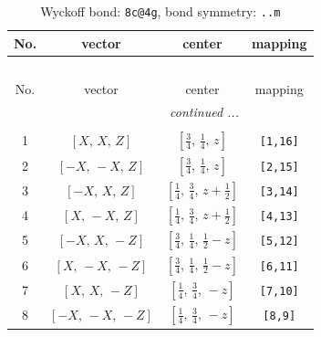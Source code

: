 \documentclass[fleqn,8pt]{jsarticle}
\begin{document}
\renewcommand{\arraystretch}{1.2}
\begin{longtable}{cccc}
\caption{Wyckoff bond: {\tt 8c@4g}, bond symmetry: {\tt ..m}}
 \\
 \hline \hline
No. & vector & center & mapping \\ \hline \endfirsthead

\multicolumn{3}{l}{\tablename\ \thetable{}} \\
 \hline \hline
No. & vector & center & mapping \\ \hline \endhead

 \hline \hline
\multicolumn{3}{r}{\footnotesize\it continued ...} \\ \endfoot

 \hline \hline
\multicolumn{3}{r}{} \\ \endlastfoot

1 & $\left[ X,\, X,\, Z \right]$ & $\left[ \frac{3}{4},\, \frac{1}{4},\, z \right]$ & {\tt [1,16]} \\ \hline
2 & $\left[ - X,\, - X,\, Z \right]$ & $\left[ \frac{3}{4},\, \frac{1}{4},\, z \right]$ & {\tt [2,15]} \\ \hline
3 & $\left[ - X,\, X,\, Z \right]$ & $\left[ \frac{1}{4},\, \frac{3}{4},\, z + \frac{1}{2} \right]$ & {\tt [3,14]} \\ \hline
4 & $\left[ X,\, - X,\, Z \right]$ & $\left[ \frac{1}{4},\, \frac{3}{4},\, z + \frac{1}{2} \right]$ & {\tt [4,13]} \\ \hline
5 & $\left[ - X,\, X,\, - Z \right]$ & $\left[ \frac{3}{4},\, \frac{1}{4},\, \frac{1}{2} - z \right]$ & {\tt [5,12]} \\ \hline
6 & $\left[ X,\, - X,\, - Z \right]$ & $\left[ \frac{3}{4},\, \frac{1}{4},\, \frac{1}{2} - z \right]$ & {\tt [6,11]} \\ \hline
7 & $\left[ X,\, X,\, - Z \right]$ & $\left[ \frac{1}{4},\, \frac{3}{4},\, - z \right]$ & {\tt [7,10]} \\ \hline
8 & $\left[ - X,\, - X,\, - Z \right]$ & $\left[ \frac{1}{4},\, \frac{3}{4},\, - z \right]$ & {\tt [8,9]} \\
\end{longtable}
\renewcommand{\arraystretch}{1.2}
\end{document}
